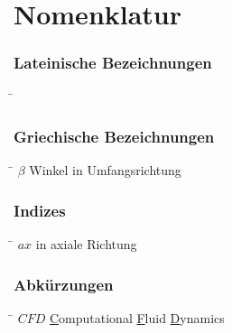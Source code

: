 \chapter*{Nomenklatur}


\subsection*{Lateinische Bezeichnungen}
\begin{tabbing}
\hspace*{2cm}\=\kill


\end{tabbing}



\subsection*{Griechische Bezeichnungen}
\begin{tabbing}
\hspace*{2cm}\=\kill
$\beta$ \> Winkel in Umfangsrichtung \\[0.2ex]
\end{tabbing}



\subsection*{Indizes}
\begin{tabbing}
\hspace*{2cm}\=\kill
$ax$ \> in axiale Richtung \\[0.2ex]
\end{tabbing}



\subsection*{Abk\"urzungen}
\begin{tabbing}
\hspace*{2cm}\=\kill
$CFD$ \> \underline{C}omputational \underline{F}luid \underline{D}ynamics \\[0.2ex]
\end{tabbing}
